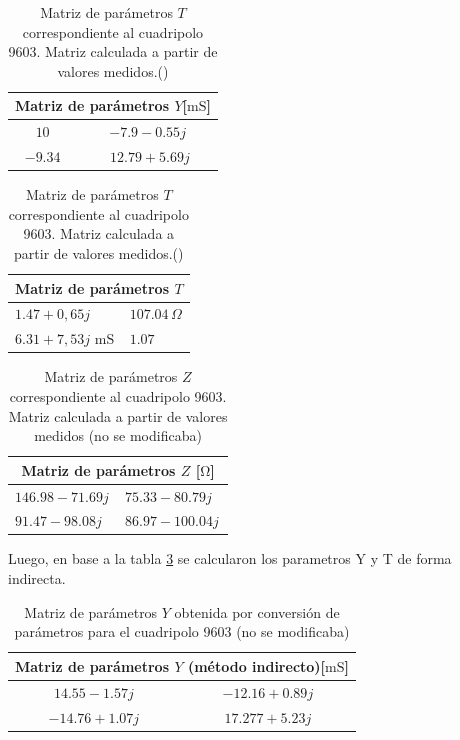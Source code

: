 	\begin{table}[H]
\centering
\begin{minipage}{0.48\textwidth}
\centering
\begin{tabular}{|c|c|}
\hline
\multicolumn{2}{|c|}{\textbf{Matriz de parámetros $Y$[$\mathrm{mS}$]}} \\ \hline
$10      \,$ & $-7.9 - 0.55j\,$ \\ \hline
$-9.34      \,$ & $  $  $12.79 + 5.69j\,$ \\ \hline
\end{tabular}
\caption{Matriz de parámetros $Y$ correspondiente al cuadripolo 9603. Matriz calculada a partir de valores medidos. ()}
\label{tab:matriz_Y9603}
\end{minipage}
\hfill
\begin{minipage}{0.48\textwidth}
\centering
\begin{tabular}{|l|l|}
\hline
\multicolumn{2}{|c|}{\textbf{Matriz de parámetros $T$}} \\ \hline
$1.47 + 0,65j$ & $107.04\,\Omega$ \\ \hline
$6.31 + 7,53j$ $ \mathrm{mS} $ & $1.07$ \\ \hline
\end{tabular}
\caption{Matriz de parámetros $T$ correspondiente al cuadripolo 9603. Matriz calculada a partir de valores medidos.()}
\label{tab:matriz_T9603}
\end{minipage}
\end{table}

\begin{table}[H]
\centering
\begin{tabular}{|l|l|}
\hline
\multicolumn{2}{|c|}{\textbf{Matriz de parámetros $Z$ [$\mathrm{\Omega}$]}} \\ \hline
$146.98 - 71.69j\,$ & $75.33 - 80.79j\,$ \\ \hline
$91.47 - 98.08j\,$ & $86.97 - 100.04j\,$ \\ \hline
\end{tabular}
\caption{Matriz de parámetros $Z$ correspondiente al cuadripolo 9603. Matriz calculada a partir de valores medidos (no se modificaba)}
\label{tab:matriz_Z9603}
\end{table}

Luego, en base a la tabla \ref{tab:matriz_Z9603} se calcularon los parametros Y y T de forma indirecta.

\begin{table}[H]
\centering
\begin{tabular}{|c|c|}
\hline
\multicolumn{2}{|c|}{\textbf{Matriz de parámetros $Y$ (método indirecto)[$\mathrm{mS}$]}} \\ \hline
$14.55 - 1.57j\,$ & $-12.16 + 0.89j\,$ \\ \hline
$-14.76 + 1.07j\,$ & $17.277 + 5.23j\,$ \\ \hline
\end{tabular}
\caption{Matriz de parámetros $Y$ obtenida por conversión de parámetros para el cuadripolo 9603 (no se modificaba)}
\label{tab:matriz_Y9603_indirecta}
\end{table}

